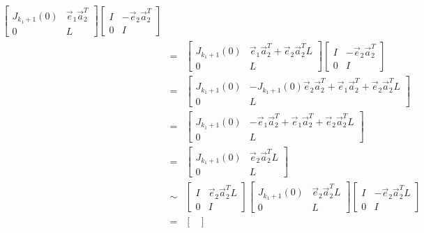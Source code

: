\documentclass[letterpaper,12pt,fleqn]{article}
\newcommand{\va}{\vec{a}}
\newcommand{\ve}{\vec{e}}
\begin{document}
\begin{theproof}
\begin{description}
\begin{description}
\begin{eqnarray*}
        \begin{bmatrix}
          J_{k_1+1}(0) & \ve_1\va_2^T \\
          0 & L
        \end{bmatrix}
        \begin{bmatrix}
          I & -\ve_2\va_2^T \\
          0 & I
        \end{bmatrix} \\
        &=& \begin{bmatrix}
          J_{k_1+1}(0) & \ve_1\va_2^T+\ve_2\va_2^TL \\
          0 & L
        \end{bmatrix}
        \begin{bmatrix}
          I & -\ve_2\va_2^T \\
          0 & I
        \end{bmatrix} \\
        &=& \begin{bmatrix}
          J_{k_1+1}(0) & -J_{k_1+1}(0)\ve_2\va_2^T+\ve_1\va_2^T+\ve_2\va_2^TL \\
          0 & L
        \end{bmatrix} \\
        &=& \begin{bmatrix}
          J_{k_1+1}(0) & -\ve_1\va_2^T+\ve_1\va_2^T+\ve_2\va_2^TL \\
          0 & L
        \end{bmatrix} \\
        &=& \begin{bmatrix}
          J_{k_1+1}(0) & \ve_2\va_2^TL \\
          0 & L
        \end{bmatrix} \\
        &\sim& \begin{bmatrix}
          I & \ve_2\va_2^TL \\
          0 & I
        \end{bmatrix}
        \begin{bmatrix}
          J_{k_1+1}(0) & \ve_2\va_2^TL \\
          0 & L
        \end{bmatrix}
        \begin{bmatrix}
          I & -\ve_2\va_2^TL \\
          0 & I
        \end{bmatrix} \\
        &=& \begin{bmatrix}

\end{bmatrix}
\end{eqnarray*}
\end{description}
\end{description}
\end{theproof}
\end{document}
